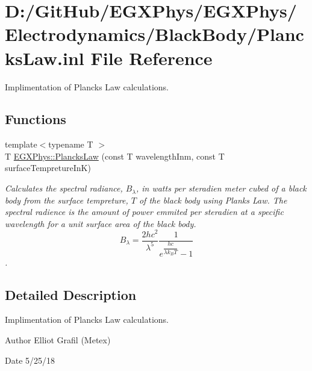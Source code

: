 \hypertarget{_plancks_law_8inl}{}\section{D\+:/\+Git\+Hub/\+E\+G\+X\+Phys/\+E\+G\+X\+Phys/\+Electrodynamics/\+Black\+Body/\+Plancks\+Law.inl File Reference}
\label{_plancks_law_8inl}


Implimentation of Planck\textquotesingle{}s Law calculations.  


\subsection*{Functions}
\begin{DoxyCompactItemize}
\item 
{\footnotesize template$<$typename T $>$ }\\T \mbox{\hyperlink{group___e_g_x_phys-_electrodynamics-_black_body-_plancks_law_ga44d8dc3e072ffc7d860cd8f07463f091}{E\+G\+X\+Phys\+::\+Plancks\+Law}} (const T wavelength\+Inm, const T surface\+Tempreture\+InK)
\begin{DoxyCompactList}\small\item\em Calculates the spectral radiance, $B_{\lambda}$, in watts per steradien meter cubed of a black body from the surface tempreture, $T$ of the black body using Plank\textquotesingle{}s Law. The spectral radience is the amount of power emmited per steradien at a specific wavelength for a unit surface area of the black body. \[ B_{\lambda} = \dfrac{2 h c^2}{\lambda^5} \dfrac{1}{e^{\dfrac{hc}{\lambda k_B T}} - 1} \]. \end{DoxyCompactList}\end{DoxyCompactItemize}


\subsection{Detailed Description}
Implimentation of Planck\textquotesingle{}s Law calculations. 

\begin{DoxyAuthor}{Author}
Elliot Grafil (Metex) 
\end{DoxyAuthor}
\begin{DoxyDate}{Date}
5/25/18 
\end{DoxyDate}
